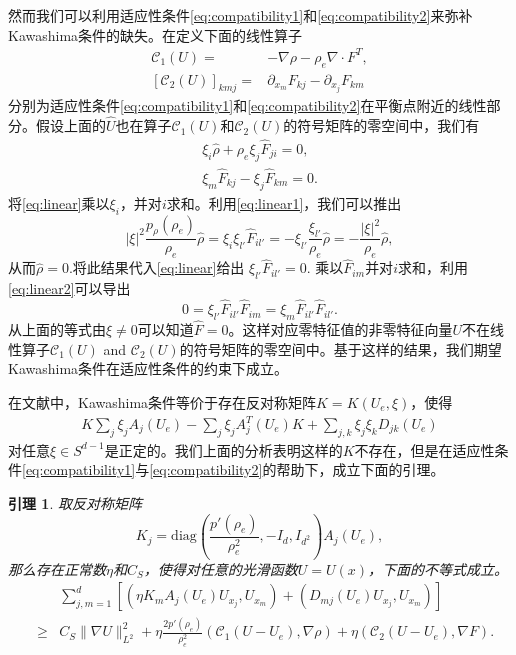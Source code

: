 \documentclass{article}
\newtheorem{lemma}{引理}
\begin{document}
然而我们可以利用适应性条件\eqref{eq:compatibility1}和\eqref{eq:compatibility2}来弥补Kawashima条件的缺失。在定义下面的线性算子
\begin{eqnarray}\label{eq:cformula}
{\mathcal C}_1(U) = & -\nabla\rho - \rho_e \nabla\cdot F^T, \nonumber \\
{[{\mathcal C}_2(U)]}_{kmj} = & \partial_{x_m} F_{kj} - \partial_{x_j} F_{km}
\end{eqnarray}
分别为适应性条件\eqref{eq:compatibility1}和\eqref{eq:compatibility2}在平衡点附近的线性部分。假设上面的$\hat{U}$也在算子${\mathcal C}_1(U)$和${\mathcal C}_2(U)$的符号矩阵的零空间中，我们有
\begin{eqnarray}
\xi_i \hat{\rho} + \rho_e \xi_{j} \hat{F}_{ji} = 0 , \label{eq:linear1}\\
\xi_{m} \hat{F}_{kj} - \xi_{j} \hat{F}_{km} =0. \label{eq:linear2}
\end{eqnarray}
将\eqref{eq:linear}乘以$\xi_i$，并对$i$求和。利用\eqref{eq:linear1}，我们可以推出
$$
|\xi|^2 \frac{p_\rho(\rho_e)}{\rho_e} \hat{\rho}  =  \xi_i \xi_{l'} \hat{F}_{il'}  = - \xi_{l'} \frac{\xi_{l'}  }{\rho_e} \hat{\rho} = -\frac{|\xi|^2}{\rho_e} \hat{\rho},
$$
从而$\hat{\rho}=0.$将此结果代入\eqref{eq:linear}给出
 $\xi_{l'} \hat{F}_{il'} = 0 .$
乘以$\hat{F}_{im}$并对$i$求和，利用\eqref{eq:linear2}可以导出
$$0=\xi_{l'} \hat{F} _{il'} \hat{F}_{im} = \xi_m \hat{F} _{il'}\hat{F} _{il'}.$$
从上面的等式由$\xi \neq 0$可以知道$\hat{F}=0$。这样对应零特征值的非零特征向量$U$不在线性算子${\mathcal C}_1(U)$ and ${\mathcal C}_2(U)$的符号矩阵的零空间中。基于这样的结果，我们期望Kawashima条件在适应性条件的约束下成立。

在文献\cite{shizuta1985systems}中，Kawashima条件等价于存在反对称矩阵$K=K(U_e, \xi)$，使得
\begin{eqnarray*}
  K\sum_{j}\xi_j A_j(U_e) - \sum_{j}\xi_j A_j^T(U_e)K + \sum_{j, k}\xi_j\xi_kD_{jk}(U_e)
\end{eqnarray*}
对任意$\xi\in S^{d-1}$是正定的。我们上面的分析表明这样的$K$不存在，但是在适应性条件\eqref{eq:compatibility1}与\eqref{eq:compatibility2}的帮助下，成立下面的引理。
\begin{lemma}\label{lemmaK}
取反对称矩阵
$$
K_j = \mbox{diag}\left(\frac{p'(\rho_e)}{\rho_e^2}, -I_d, I_{d^2}\right)A_j(U_e),
$$
那么存在正常数$\eta$和$C_S$，使得对任意的光滑函数$U =U(x)$，下面的不等式成立。
\begin{eqnarray}\label{eq:prop}
  &&\sum_{j,m=1}^d [( \eta K_m A_j(U_e) U_{x_j},U_{x_m}) + (D_{mj}(U_e) U_{x_j},U_{x_m})]\nonumber \\
  &\ge& C_S \|\nabla U \|_{L^2}^2 +\eta\frac{2p'(\rho_e)}{\rho_e^2}({\mathcal C}_1(U - U_e), \nabla \rho) + \eta({\mathcal C}_2(U - U_e), \nabla F).
\end{eqnarray}

\end{lemma}
\end{document}
